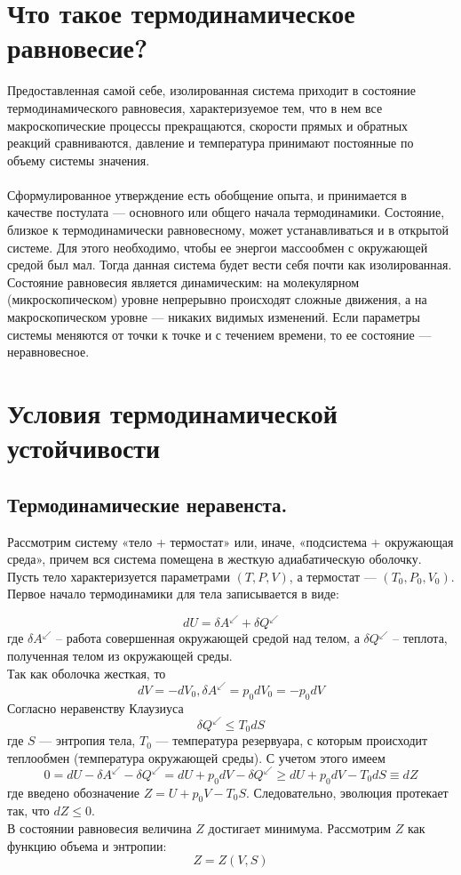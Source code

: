 \documentclass[a4paper,14pt]{article} %
\begin{document}
\section{Что такое термодинамическое равновесие?}
	Предоставленная самой себе,
	изолированная система приходит в состояние термодинамического равновесия, характеризуемое тем, что в нем все макроскопические процессы
	прекращаются, скорости прямых и обратных реакций сравниваются, давление и температура принимают постоянные по объему системы значения.
	\\\\
	Сформулированное утверждение есть обобщение опыта, и принимается
	в качестве постулата — основного или общего начала термодинамики.
	Состояние, близкое к термодинамически равновесному, может устанавливаться и в открытой системе. Для этого необходимо, чтобы ее энергои массообмен с окружающей средой был мал. Тогда данная система будет
	вести себя почти как изолированная.
	Состояние равновесия является динамическим: на молекулярном (микроскопическом) уровне непрерывно происходят сложные движения, а на
	макроскопическом уровне — никаких видимых изменений.
	Если параметры системы меняются от точки к точке и с течением
	времени, то ее состояние — неравновесное.
	
	\section{Условия термодинамической устойчивости}
	
	\subsection{ Термодинамические неравенста.}
	
	Рассмотрим систему «тело + термостат» или, иначе, «подсистема + окружающая среда», причем вся система помещена в жесткую адиабатическую оболочку. Пусть тело характеризуется параметрами $(T, P, V)$, а
	термостат — $(T_0, P_0, V_0)$. Первое начало термодинамики для тела записывается в виде:
	
	\[dU = \delta A^\swarrow  + \delta Q^\swarrow \]
	где $\delta A^\swarrow$ -- работа совершенная окружающей средой над телом, а $\delta Q^\swarrow$ -- теплота, полученная телом из окружающей среды. \\
	Так как оболочка жесткая, то
	\[dV  = -dV_0, \delta A^ \swarrow = p_0 dV_0 = -p_0 dV\]
	Согласно неравенству Клаузиуса
	\[\delta Q^\swarrow \leq T_0 dS\]
	где $S$ — энтропия тела, $T_0$ — температура резервуара, с которым происходит теплообмен (температура окружающей среды). С учетом
	этого имеем
	\[0 = dU - \delta A^\swarrow - \delta Q ^ \swarrow = dU + p_0 dV - \delta Q ^ \swarrow \geq dU + p_0dV - T_0 dS \equiv dZ\]
	где введено обозначение $Z = U + p_0V - T_0 S$. Следовательно, эволюция
	протекает так, что $dZ \leq 0$.\\
	В состоянии равновесия величина $Z$ достигает минимума. Рассмотрим
	$Z$ как функцию объема и энтропии:
	\[Z = Z (V,S)\]
	
\end{document}
